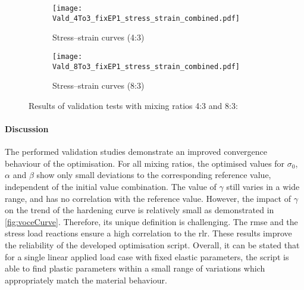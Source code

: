 \begin{figure}[H]
\centering

\begin{subfigure}[t]{0.495\textwidth}
    \centering
    \texttt{[image: Vald\_4To3\_fixEP1\_stress\_strain\_combined.pdf]}
    \caption{Stress–strain curves (4:3)}
    \label{fig:validStressStrain4to3}
\end{subfigure}
\hfill
\begin{subfigure}[t]{0.495\textwidth}
    \centering
    \texttt{[image: Vald\_8To3\_fixEP1\_stress\_strain\_combined.pdf]}
    \caption{Stress–strain curves (8:3)}
    \label{fig:validStressStrain8to3}
\end{subfigure}
\caption{Results of validation tests with mixing ratios 4:3 and 8:3:}
\label{fig:validStressStrain4and8}
\end{figure}


\paragraph{Discussion}
The performed validation studies demonstrate an improved convergence behaviour of the optimisation. For all mixing ratios, the optimised values for $\sigma_0$, $\alpha$ and $\beta$ show only small deviations to the corresponding  reference value, independent of the initial value combination. The value of $\gamma$ still varies in a wide range, and has no correlation with the reference value. However, the impact of $\gamma$ on the trend of the hardening curve is relatively small as demonstrated in \autoref{fig:voceCurve}. Therefore, its unique definition is challenging. The \acrshort{rmse} and the stress load reactions ensure a high correlation to the \acrlong{rlr}. These results improve the reliability of the developed optimisation script. Overall, it can be stated that for a single linear applied load case with fixed elastic parameters, the script is able to find plastic parameters within a small range of variations which appropriately match the material behaviour.



